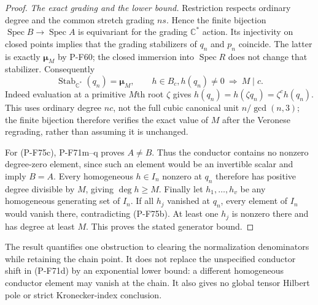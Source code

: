 \begin{proof}
\emph{The exact grading and the lower bound.}
Restriction respects ordinary degree and the common
stretch grading $ns$.  Hence the finite bijection
$\operatorname{Spec}B\to\operatorname{Spec}A$ is
equivariant for the grading $\mathbb C^*$ action.
Its injectivity on closed points implies that the
grading stabilizers of $q_n$ and $p_n$ coincide.
The latter is exactly $\boldsymbol\mu_M$ by P-F60;
the closed immersion into $\operatorname{Spec}R$
does not change that stabilizer.  Consequently
\[
 \operatorname{Stab}_{\mathbb C^*}(q_n)=\boldsymbol\mu_M,
 \qquad h\in B_c, h(q_n)\ne0\ \Longrightarrow\ M\mid c.
                                                               \tag{P-F75k}
\]
Indeed evaluation at a primitive $M$th root $\zeta$
gives $h(q_n)=h(\zeta q_n)=\zeta^c h(q_n)$.
This uses ordinary degree $nc$, not the full cubic
canonical unit $n/\gcd(n,3)$; the finite bijection
therefore verifies the exact value of $M$ after the
Veronese regrading, rather than assuming it is unchanged.

For (P-F75c), P-F71m--q proves $A\ne B$.
Thus the conductor contains no nonzero degree-zero
element, since such an element would be an invertible
scalar and imply $B=A$.
Every homogeneous $h\in I_n$ nonzero at $q_n$ therefore
has positive degree divisible by $M$, giving $\deg h\ge M$.
Finally let $h_1,\ldots,h_v$ be any homogeneous generating
set of $I_n$.  If all $h_j$ vanished at $q_n$, every
element of $I_n$ would vanish there, contradicting
(P-F75b).  At least one $h_j$ is nonzero there and
has degree at least $M$.  This proves the stated
generator bound.
\end{proof}

The result quantifies one obstruction to clearing the
normalization denominators while retaining the chain
point.  It does not replace the unspecified conductor
shift in (P-F71d) by an exponential lower bound: a
different homogeneous conductor element may vanish
at the chain.  It also gives no global tensor Hilbert
pole or strict Kronecker-index conclusion.

